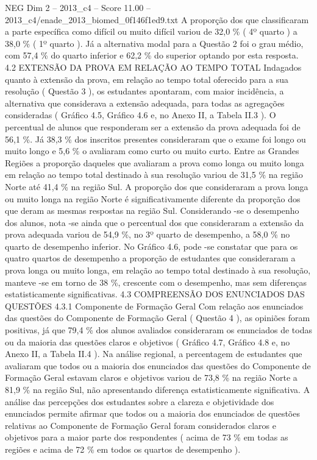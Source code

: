 \begin{textsample}{NEG Dim 2 – 2013\_c4 – Score 11.00 – 2013\_c4/enade\_2013\_biomed\_0f146f1ed9.txt}
A proporção dos que classificaram a parte específica como difícil ou muito difícil variou de 32,0 \% ( 4º quarto ) a 38,0 \% ( 1º quarto ).
Já a alternativa modal para a Questão 2 foi o grau médio, com 57,4 \% do quarto inferior e 62,2 \% do superior optando por esta resposta. 4.2 EXTENSÃO DA PROVA EM RELAÇÃO AO TEMPO TOTAL Indagados quanto à extensão da prova, em relação ao tempo total oferecido para a sua resolução ( Questão 3 ), os estudantes apontaram, com maior incidência, a alternativa que considerava a extensão adequada, para todas as agregações consideradas ( Gráfico 4.5, Gráfico 4.6 e, no Anexo II, a Tabela II.3 ).
O percentual de alunos que responderam ser a extensão da prova adequada foi de 56,1 \%.
Já 38,3 \% dos inscritos presentes consideraram que o exame foi longo ou muito longo e 5,6 \% o avaliaram como curto ou muito curto.
Entre as Grandes Regiões a proporção daqueles que avaliaram a prova como longa ou muito longa em relação ao tempo total destinado à sua resolução variou de 31,5 \% na região Norte até 41,4 \% na região Sul.
A proporção dos que consideraram a prova longa ou muito longa na região Norte é significativamente diferente da proporção dos que deram as mesmas respostas na região Sul.
Considerando -se o desempenho dos alunos, nota -se ainda que o percentual dos que consideraram a extensão da prova adequada variou de 54,9 \%, no 3º quarto de desempenho, a 58,0 \% no quarto de desempenho inferior.
No Gráfico 4.6, pode -se constatar que para os quatro quartos de desempenho a proporção de estudantes que consideraram a prova longa ou muito longa, em relação ao tempo total destinado à sua resolução, manteve -se em torno de 38 \%, crescente com o desempenho, mas sem diferenças estatisticamente significativas. 4.3 COMPREENSÃO DOS ENUNCIADOS DAS QUESTÕES 4.3.1 Componente de Formação Geral Com relação aos enunciados das questões do Componente de Formação Geral ( Questão 4 ), as opiniões foram positivas, já que 79,4 \% dos alunos avaliados consideraram os enunciados de todas ou da maioria das questões claros e objetivos ( Gráfico 4.7, Gráfico 4.8 e, no Anexo II, a Tabela II.4 ).
Na análise regional, a percentagem de estudantes que avaliaram que todos ou a maioria dos enunciados das questões do Componente de Formação Geral estavam claros e objetivos variou de 73,8 \% na região Norte a 81,9 \% na região Sul, não apresentando diferença estatisticamente significativa.
A análise das percepções dos estudantes sobre a clareza e objetividade dos enunciados permite afirmar que todos ou a maioria dos enunciados de questões relativas ao Componente de Formação Geral foram considerados claros e objetivos para a maior parte dos respondentes ( acima de 73 \% em todas as regiões e acima de 72 \% em todos os quartos de desempenho ).

\end{textsample}
